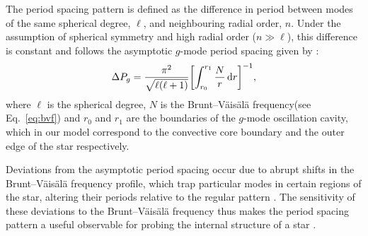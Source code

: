 \documentclass[twocolumn, twocolappendix, oneside]{aastex631}
\newcommand{\bvf}{Brunt–Väisälä frequency\xspace}
\newcommand{\gmode}{$g$-mode\xspace}
\begin{document}
The period spacing pattern is defined as the difference in period between modes of the same spherical degree, $\ell$, and neighbouring radial order, $n$. Under the assumption of spherical symmetry and high radial order ($n \gg \ell$), this difference is constant and follows the asymptotic \gmode period spacing given by \citet{Tassoul+1980}:
\begin{equation}\label{eq:period-spacing}
    \Delta P_g = \frac{\pi^2}{\sqrt{\ell(\ell+1)}} \qty[\int_{r_0}^{r_1} \frac{N}{r} \dd{r}]^{-1},
\end{equation}
where $\ell$ is the spherical degree, $N$ is the \bvf (see Eq.~\ref{eq:bvf}) and $r_0$ and $r_1$ are the boundaries of the \gmode oscillation cavity, which in our model correspond to the convective core boundary and the outer edge of the star respectively.

Deviations from the asymptotic period spacing occur due to abrupt shifts in the \bvf profile, which trap particular modes in certain regions of the star, altering their periods relative to the regular pattern \citep[e.g.][]{Dziembowski1993,Miglio+2008}. The sensitivity of these deviations to the \bvf thus makes the period spacing pattern a useful observable for probing the internal structure of a star \citep[e.g.][]{Aerts+2010}.
\end{document}
